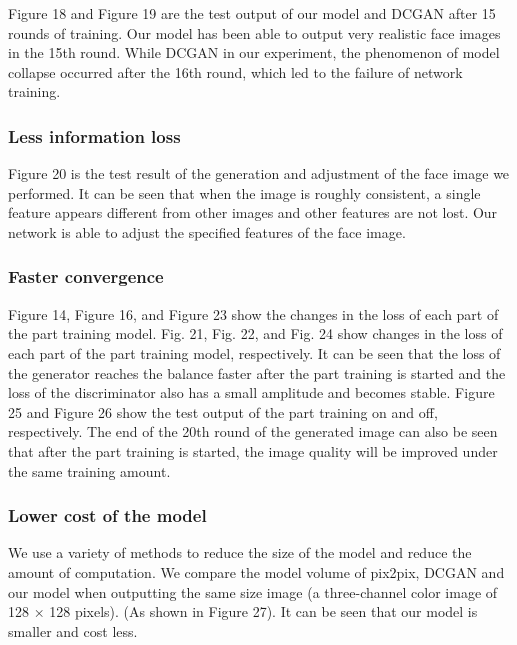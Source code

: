 Figure 18 and Figure 19 are the test output of our model and DCGAN after 15 rounds of training. Our model has been able to output very realistic face images in the 15th round. While DCGAN in our experiment, the phenomenon of model collapse occurred after the 16th round, which led to the failure of network training.

\subsubsection*{Less information loss}
Figure 20 is the test result of the generation and adjustment of the face image we performed.
It can be seen that when the image is roughly consistent, a single feature appears different from other images and other features are not lost.
Our network is able to adjust the specified features of the face image.

\subsubsection*{Faster convergence}
Figure 14, Figure 16, and Figure 23 show the changes in the loss of each part of the part training model.
Fig. 21, Fig. 22, and Fig. 24 show changes in the loss of each part of the part training model, respectively.
It can be seen that the loss of the generator reaches the balance faster after the part training is started and the loss of the discriminator also has a small amplitude and becomes stable.
Figure 25 and Figure 26 show the test output of the part training on and off, respectively. The end of the 20th round of the generated image can also be seen that after the part training is started, the image quality will be improved under the same training amount.

\subsubsection*{Lower cost of the model}
We use a variety of methods to reduce the size of the model and reduce the amount of computation.
We compare the model volume of pix2pix, DCGAN and our model when outputting the same size image (a three-channel color image of 128 × 128 pixels). (As shown in Figure 27).
It can be seen that our model is smaller and cost less.